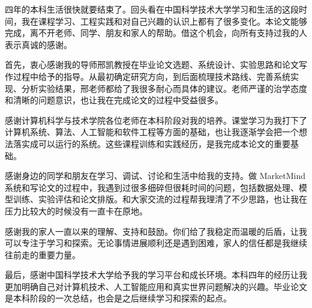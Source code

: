 
\begin{acknowledgements}

四年的本科生活很快就要结束了。回头看在中国科学技术大学学习和生活的这段时间，我在课程学习、工程实践和对自己兴趣的认识上都有了很多变化。本论文能够完成，离不开老师、同学、朋友和家人的帮助。借这个机会，向所有支持过我的人表示真诚的感谢。

首先，衷心感谢我的导师邢凯教授在毕业论文选题、系统设计、实验思路和论文写作过程中给予的指导。从最初确定研究方向，到后面梳理技术路线、完善系统实现、分析实验结果，邢老师都给了我很多耐心而具体的建议。老师严谨的治学态度和清晰的问题意识，也让我在完成论文的过程中受益很多。

感谢计算机科学与技术学院各位老师在本科阶段对我的培养。课堂学习为我打下了计算机系统、算法、人工智能和软件工程等方面的基础，也让我逐渐学会把一个想法落实成可以运行的系统。这些课程训练和实践经历，是我完成本论文的重要基础。

感谢身边的同学和朋友在学习、调试、讨论和生活中给我的支持。做 MarketMind 系统和写论文的过程中，我遇到过很多细碎但很耗时间的问题，包括数据处理、模型训练、实验评估和论文排版。和大家交流的过程帮我理清了不少思路，也让我在压力比较大的时候没有一直卡在原地。

感谢我的家人一直以来的理解、支持和鼓励。你们给了我稳定而温暖的后盾，让我可以专注于学习和探索。无论事情进展顺利还是遇到困难，家人的信任都是我继续往前走的重要力量。

最后，感谢中国科学技术大学给予我的学习平台和成长环境。本科四年的经历让我更加明确自己对计算机技术、人工智能应用和真实世界问题解决的兴趣。毕业论文是本科阶段的一次总结，也会是之后继续学习和探索的起点。

\end{acknowledgements}
